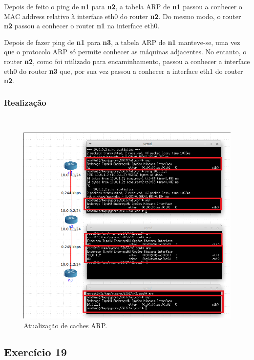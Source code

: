 \documentclass{llncs}
\begin{document}
Depois de feito o ping de \textbf{n1} para \textbf{n2}, a tabela ARP de \textbf{n1} passou a conhecer o MAC address relativo à interface eth0 do router \textbf{n2}. Do mesmo modo, o router \textbf{n2} passou a conhecer o router \textbf{n1} na interface eth0.

Depois de fazer ping de \textbf{n1} para \textbf{n3}, a tabela ARP de \textbf{n1} manteve-se, uma vez que o protocolo ARP só permite conhecer as máquinas adjacentes. No entanto, o router \textbf{n2}, como foi utilizado para encaminhamento, passou a conhecer a interface eth0 do router \textbf{n3} que, por sua vez passou a conhecer a interface eth1 do router \textbf{n2}.

\subsubsection{Realização}\rule[-10pt]{0pt}{10pt}\\

\begin{figure}
  \begin{center}
    \includegraphics[scale=0.6]{./imagens/5_18.png} 
  \end{center}
  \caption{Atualização de caches ARP.}
  \label{fig:5_18}
\end{figure} 

\clearpage
\subsection{Exercício 19}
\end{document}
